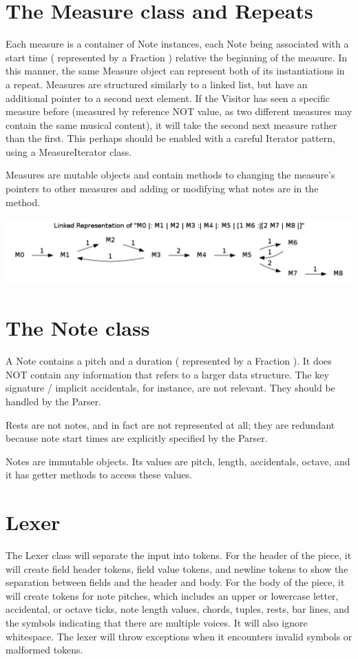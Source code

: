 \documentclass{amsart}
\begin{document}
\section{ The Measure class and Repeats }

Each measure is a container of Note instances, each Note being associated with a start time ( represented by a Fraction ) relative the beginning of the measure. In this manner, the same Measure object can represent both of its instantiations in a repeat. Measures are structured similarly to a linked list, but have an additional pointer to a second next element. If the Visitor has seen a specific measure before (measured by reference NOT value, as two different measures may contain the same musical content), it will take the second next measure rather than the first. This perhaps should be enabled with a careful Iterator pattern, using a MeasureIterator class.  

Measures are mutable objects and contain methods to changing the measure's pointers to other measures and adding or modifying what notes are in the method.  

\includegraphics[width=\linewidth]{measure_example.png}

\section{ The Note class }
A Note contains a pitch and a duration  ( represented by a Fraction ).  It does NOT contain any information that refers to a larger data structure. The key signature / implicit accidentals, for instance, are not relevant. They should be handled by the Parser.

Rests are not notes, and in fact are not represented at all; they are redundant because note start times are explicitly specified by the Parser.

Notes are immutable objects.  Its values are pitch, length, accidentals, octave, and it has getter methods to access these values.  

\section{ Lexer }
The Lexer class will separate the input into tokens.  For the header of the piece, it will create field header tokens, field value tokens, and newline tokens to show the separation between fields and the header and body.  
For the body of the piece, it will create tokens for note pitches, which includes an upper or lowercase letter, accidental, or octave ticks, note length values, chords, tuples, rests, bar lines, and the symbols indicating that there are multiple voices.  It will also ignore whitespace.
The lexer will throw exceptions when it encounters invalid symbols or malformed tokens.  
\end{document}
